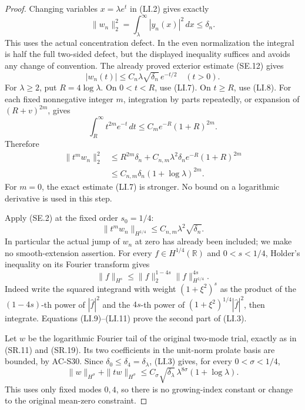 \begin{proof}
Changing variables \(x=\lambda e^t\) in (LI.2) gives exactly
\[
       \|w_n\|_2^2
          =\int_\lambda^\infty |y_n(x)|^2\,dx
          \le \delta_n.
       \tag{LI.7}
\]
This uses the actual concentration defect.  In the even normalization
the integral is half the full two-sided defect, but the displayed
inequality suffices and avoids any change of convention.
The already proved exterior estimate (SE.12) gives
\[
              |w_n(t)|\le C_n\lambda\sqrt{\delta_n}\,e^{-t/2}
                         \quad(t>0).
              \tag{LI.8}
\]
For \(\lambda\ge2\), put \(R=4\log\lambda\).
On \(0<t<R\), use (LI.7).  On \(t\ge R\), use (LI.8).
For each fixed nonnegative integer \(m\), integration by parts
repeatedly, or expansion of \((R+v)^{2m}\), gives
\[
 \int_R^\infty t^{2m}e^{-t}\,dt
                 \le C_m e^{-R}(1+R)^{2m}.
\]
Therefore
\[
 \begin{split}
 \|t^m w_n\|_2^2
 &\le R^{2m}\delta_n+
       C_{n,m}\lambda^2\delta_n e^{-R}(1+R)^{2m}\\
 &\le C_{n,m}\delta_n(1+\log\lambda)^{2m}.
 \end{split}
 \tag{LI.9}
\]
For \(m=0\), the exact estimate (LI.7) is stronger.
No bound on a logarithmic derivative is used in this step.

Apply (SE.2) at the fixed order \(s_0=1/4\):
\[
              \|t^m w_n\|_{H^{1/4}}
                       \le C_{n,m}\lambda^2\sqrt{\delta_n}.
              \tag{LI.10}
\]
In particular the actual jump of \(w_n\) at zero has already been
included; we make no smooth-extension assertion.  For every
\(f\in H^{1/4}(\mathbb R)\) and \(0<s<1/4\), Holder's inequality
on its Fourier transform gives
\[
 \|f\|_{H^s}
       \le \|f\|_2^{1-4s}\|f\|_{H^{1/4}}^{4s}.
 \tag{LI.11}
\]
Indeed write the squared integrand with weight \((1+\xi^2)^s\)
as the product of the \((1-4s)\)-th power of
\(|\widehat f|^2\) and the \(4s\)-th power of
\((1+\xi^2)^{1/4}|\widehat f|^2\), then integrate.
Equations (LI.9)--(LI.11) prove the second part of (LI.3).

Let \(w\) be the logarithmic Fourier tail of the original two-mode
trial, exactly as in (SR.11) and (SR.19).  Its two coefficients in
the unit-norm prolate basis are bounded, by AC-S30.  Since
\(\delta_0\le\delta_4=\delta_\lambda\), (LI.3) gives, for every
\(0<\sigma<1/4\),
\[
 \|w\|_{H^\sigma}+\|tw\|_{H^\sigma}
      \le C_\sigma\sqrt{\delta_\lambda}\,
                     \lambda^{8\sigma}(1+\log\lambda).
 \tag{LI.12}
\]
This uses only fixed modes \(0,4\), so there is no growing-index
constant or change to the original mean-zero constraint.


\end{proof}
